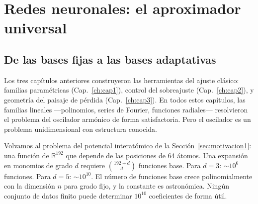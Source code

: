 
\chapter{Redes neuronales: el aproximador universal}
\label{ch:cap4}

\section{De las bases fijas a las bases adaptativas}
\label{sec:bases_adaptativas}


Los tres capítulos anteriores construyeron las herramientas del ajuste
clásico: familias paramétricas (Cap.~\ref{ch:cap1}), control del
sobreajuste (Cap.~\ref{ch:cap2}), y geometría del paisaje de pérdida
(Cap.~\ref{ch:cap3}). En todos estos capítulos, las familias lineales
—polinomios, series de Fourier, funciones radiales— resolvieron el
problema del oscilador armónico de forma satisfactoria. Pero el
oscilador es un problema unidimensional con estructura conocida.

Volvamos al problema del potencial interatómico de la
Sección~\ref{sec:motivacion1}: una función de $\mathbb{R}^{192}$ que
depende de las posiciones de 64 átomos. Una expansión en monomios de
grado $d$ requiere $\binom{192+d}{d}$ funciones base. Para $d = 3$:
$\sim 10^6$ funciones. Para $d = 5$: $\sim 10^{10}$. El número de
funciones base crece polinomialmente con la dimensión $n$ para grado
fijo, y la constante es astronómica. Ningún conjunto de datos finito
puede determinar $10^{10}$ coeficientes de forma útil.


